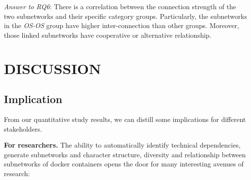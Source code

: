 \documentclass[sigconf]{acmart}
\begin{document}





\begin{mybox}
\emph{Answer to RQ6}: 
There is a correlation between the connection strength of the two subnetworks and their specific category groups. Particularly, the subnetworks in the \emph{OS-OS} group have higher inter-connection than other groups. 
Moreover, those linked subnetworks have cooperative or alternative relationship. 
\end{mybox}





\section{DISCUSSION}
\label{sec:di}

\subsection{Implication}
From our quantitative study results, we can distill some implications for different stakeholders.

\noindent\textbf{For researchers.}
The ability to automatically identify technical dependencies, generate subnetworks and character structure, diversity and relationship between subnetworks of docker containers opens the door for many interesting avenues of research: 
\end{document}
